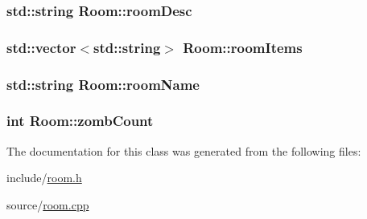 \subsubsection[{\texorpdfstring{room\+Desc}{roomDesc}}]{\setlength{\rightskip}{0pt plus 5cm}std\+::string Room\+::room\+Desc\hspace{0.3cm}{\ttfamily [private]}}\hypertarget{class_room_ae18039ced2c32837f5064961bb33e4e9}{}\label{class_room_ae18039ced2c32837f5064961bb33e4e9}
\subsubsection[{\texorpdfstring{room\+Items}{roomItems}}]{\setlength{\rightskip}{0pt plus 5cm}std\+::vector$<$std\+::string$>$ Room\+::room\+Items\hspace{0.3cm}{\ttfamily [private]}}\hypertarget{class_room_af7b9b2ab1bd1eda19d6b893c984d73d7}{}\label{class_room_af7b9b2ab1bd1eda19d6b893c984d73d7}
\subsubsection[{\texorpdfstring{room\+Name}{roomName}}]{\setlength{\rightskip}{0pt plus 5cm}std\+::string Room\+::room\+Name\hspace{0.3cm}{\ttfamily [private]}}\hypertarget{class_room_add2825ea48f72ca1b06ae26c28297cdc}{}\label{class_room_add2825ea48f72ca1b06ae26c28297cdc}
\subsubsection[{\texorpdfstring{zomb\+Count}{zombCount}}]{\setlength{\rightskip}{0pt plus 5cm}int Room\+::zomb\+Count\hspace{0.3cm}{\ttfamily [private]}}\hypertarget{class_room_afcddb9fd9012f7838876a64c834a0349}{}\label{class_room_afcddb9fd9012f7838876a64c834a0349}


The documentation for this class was generated from the following files\+:\begin{DoxyCompactItemize}
\item 
include/\hyperlink{room_8h}{room.\+h}\item 
source/\hyperlink{room_8cpp}{room.\+cpp}\end{DoxyCompactItemize}
